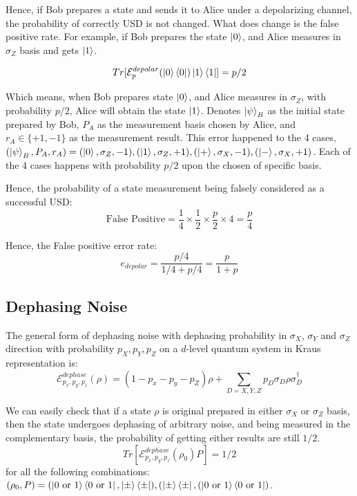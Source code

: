 \documentclass[%
 reprint,
superscriptaddress,
 amsmath,amssymb,
 aps,
]{revtex4-2}
\begin{document}
Hence, if Bob prepares a state and sends it to Alice under a depolarizing channel, the probability of correctly USD is not changed. What does change is the false positive rate. For example, if Bob prepares the state $\ket{0}$, and Alice measures in $\sigma_Z$ basis and gets $\ket{1}$.

\begin{equation}
Tr[\mathcal{E}^{depolar}_p(\ket{0}\bra{0})\ket{1}\bra{1}]=p/2
\end{equation}

Which means, when Bob prepares state $\ket{0}$, and Alice measures in $\sigma_Z$, with probability $p/2$, Alice will obtain the state $\ket{1}$. Denotes $\ket{\psi}_B$ as the initial state prepared by Bob, $P_A$ as the measurement basis chosen by Alice, and $r_A\in\{+1, -1\}$ as the measurement result. This error happened to the 4 cases, $\left(\ket{\psi}_B, P_A, r_A\right)=(\ket{0},\sigma_Z, -1), (\ket{1},\sigma_Z, +1), (\ket{+},\sigma_X, -1), (\ket{-},\sigma_X, +1)$. Each of the 4 cases happens with probability $p/2$ upon the chosen of specific basis.

Hence, the probability of a state measurement being falsely considered as a successful USD:
\begin{equation}
    \text{False Positive}=\frac{1}{4}\times\frac{1}{2}\times\frac{p}{2}\times4 = \frac{p}{4}
\end{equation}

Hence, the False positive error rate:
\begin{equation}
    e_{depolar}=\frac{p/4}{1/4+p/4}=\frac{p}{1+p}
\end{equation}

\subsection{Dephasing Noise}
The general form of dephasing noise with dephasing probability in $\sigma_X$, $\sigma_Y$ and $\sigma_Z$ direction with probability $p_X, p_Y, p_Z$ on a $d$-level quantum system in Kraus representation is:
\begin{equation}
    \mathcal{E}^{dephase}_{p_x, p_y, p_z}(\rho)=(1-p_x-p_y-p_Z)\rho+\sum_{D=X, Y, Z}p_D\sigma_D\rho\sigma_D^\dagger
\end{equation}

We can easily check that if a state $\rho$ is original prepared in either $\sigma_X$ or $\sigma_Z$ basis, then the state undergoes dephasing of arbitrary noise, and being measured in the complementary basis, the probability of getting either results are still $1/2$.
\begin{equation}
    Tr[\mathcal{E}^{dephase}_{p_x, p_y, p_z}(\rho_0)P]=1/2
\end{equation}
for all the following combinations: $(\rho_0, P)=(\ket{0\text{ or }1}\bra{0\text{ or }1}, \ket{\pm}\bra{\pm}), (\ket{\pm}\bra{\pm}, (\ket{0\text{ or }1}\bra{0\text{ or }1})$.
\end{document}

